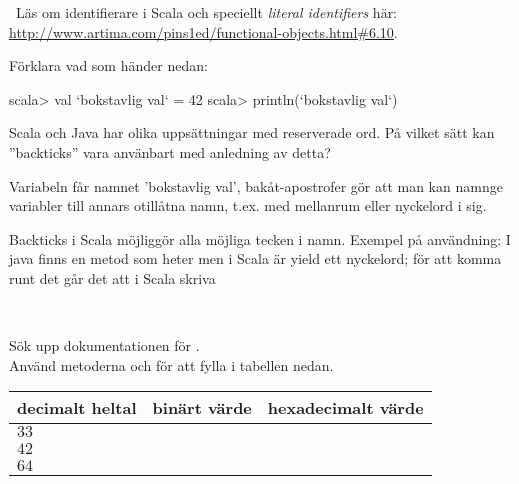 \QUESTEND





\QUESTBEGIN

\Task\Uberkurs \what~Läs om identifierare i Scala och speciellt \emph{literal identifiers} här: \url{http://www.artima.com/pins1ed/functional-objects.html#6.10}.

\Subtask Förklara vad som händer nedan:
\begin{REPLnonum}
scala> val `bokstavlig val` = 42
scala> println(`bokstavlig val`)
\end{REPLnonum}

\Subtask Scala och Java har olika uppsättningar med reserverade ord. På vilket sätt kan ''backticks'' vara använbart med anledning av detta?

\SOLUTION

\TaskSolved \what

\SubtaskSolved Variabeln får namnet 'bokstavlig val', bakåt-apostrofer  gör att man kan namnge variabler till annars otillåtna namn, t.ex. med mellanrum eller nyckelord i sig.

\SubtaskSolved Backticks i Scala möjliggör alla möjliga tecken i namn. Exempel på användning: I java finns en metod som heter  men i Scala är yield ett nyckelord; för att komma runt det går det att i Scala skriva 

\QUESTEND













\QUESTBEGIN

\Task\Uberkurs \what~

\Subtask Sök upp dokumentationen för .\\Använd metoderna  och  för att fylla i tabellen nedan.

\begin{table}[H]
\begin{tabular}{l | l | l}
decimalt heltal & binärt värde & hexadecimalt värde \\
\hline
$33$ &   &  \\
$42$ &   &  \\
$64$ &   &  \\
\end{tabular}
\end{table}

